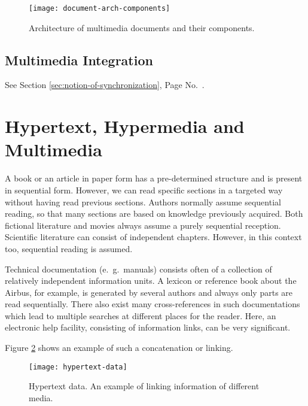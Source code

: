 \begin{figure}[hb!]
	\centering
	\texttt{[image: document-arch-components]}
	\caption{Architecture of multimedia documents and their components.}{\label{fig:document-arch-component}}
\end{figure}


\subsection{Multimedia Integration}
See Section \ref{sec:notion-of-synchronization}, Page No.\ \pageref{sec:notion-of-synchronization}.
\section{Hypertext, Hypermedia and Multimedia}
A book or an article in paper form has a pre-determined structure and is present in sequential form. However, we can read specific sections in a targeted way without having read previous sections. Authors normally assume sequential reading, so that many sections are based on knowledge previously acquired. Both fictional literature and movies always assume a purely sequential reception. Scientific literature can consist of independent chapters. However, in this context too, sequential reading is assumed.


Technical documentation (e.\ g.\, manuals) consists often of a collection of relatively independent information units. A lexicon or reference book about the Airbus, for example, is generated by several authors and always only parts are read sequentially. There also exist many cross-references in such documentations which lead to
multiple searches at different places for the reader. Here, an electronic help facility, consisting of information links, can be very significant.

Figure \ref{fig:hypertext-data} shows an example of such a concatenation or linking. 

\begin{figure}[ht!]
	\centering
	\texttt{[image: hypertext-data]}
	\caption[Hypertext data.]{Hypertext data. An example of linking information of different media.}
	\label{fig:hypertext-data}
\end{figure}

